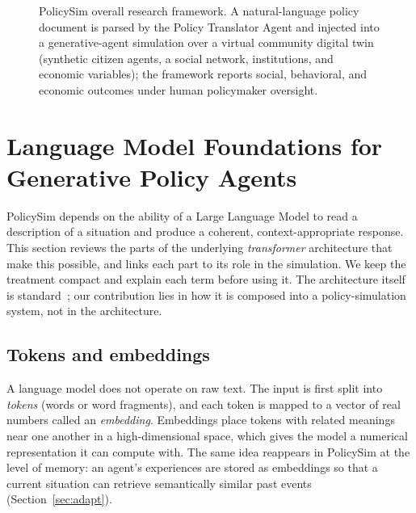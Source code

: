 \documentclass[conference]{IEEEtran}
\begin{document}
\begin{figure}[!t]
{%
}
\caption{PolicySim overall research framework. A natural-language policy document is parsed by the Policy Translator Agent and injected into a generative-agent simulation over a virtual community digital twin (synthetic citizen agents, a social network, institutions, and economic variables); the framework reports social, behavioral, and economic outcomes under human policymaker oversight.}
\label{fig:flow}
\end{figure}

\section{Language Model Foundations for Generative Policy Agents}
\label{sec:llm}

PolicySim depends on the ability of a Large Language Model to read a description of a situation and produce a coherent, context-appropriate response. This section reviews the parts of the underlying \emph{transformer} architecture that make this possible, and links each part to its role in the simulation. We keep the treatment compact and explain each term before using it. The architecture itself is standard~\cite{vaswani2017}; our contribution lies in how it is composed into a policy-simulation system, not in the architecture.

\subsection{Tokens and embeddings}
A language model does not operate on raw text. The input is first split into \emph{tokens} (words or word fragments), and each token is mapped to a vector of real numbers called an \emph{embedding}. Embeddings place tokens with related meanings near one another in a high-dimensional space, which gives the model a numerical representation it can compute with. The same idea reappears in PolicySim at the level of memory: an agent's experiences are stored as embeddings so that a current situation can retrieve semantically similar past events (Section~\ref{sec:adapt}).
\end{document}
